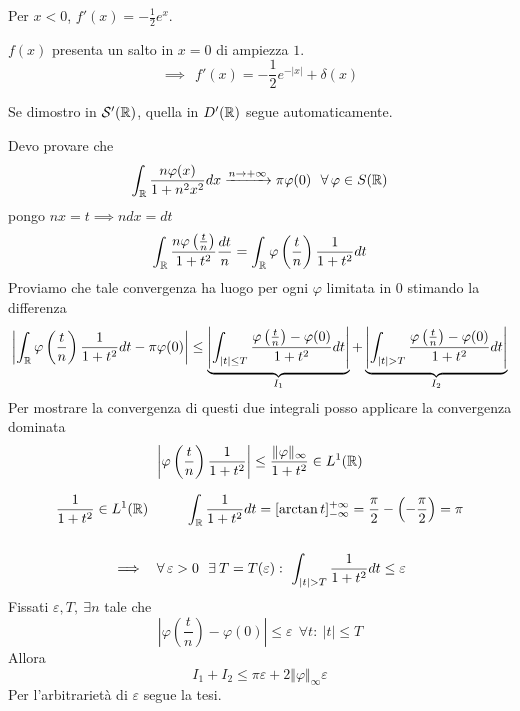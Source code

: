 Per $x < 0$, $f'(x) = - \frac{1}{2} e^{x}$.

$f(x)$ presenta un salto in $x = 0$ di ampiezza $1$.
\begin{equation*}
\implies \ \ f'(x) = - \frac{1}{2} e^{ - | x| } + \delta (x)
\end{equation*}
\Soluzione


Se dimostro in $\mathcal{S}  '(\mathbb{R})$, quella in $D'(\mathbb{R})$ segue automaticamente.

Devo provare che
\begin{equation*}
\int _{\RR }\frac{n\varphi (x)}{1 + n^{2} x^{2}} dx\xrightarrow{n\rightarrow + \infty } \pi \varphi (0) \ \ \forall \varphi \in S(\RR)
\end{equation*}
pongo $nx = t\implies ndx = dt$
\begin{equation*}
\int _{\mathbb{R} }\frac{n\varphi \left(\frac{t}{n}\right)}{1 + t^{2}}\frac{dt}{n} = \int _{\mathbb{R} } \varphi \left(\frac{t}{n}\right)\frac{1}{1 + t^{2}} dt
\end{equation*}
Proviamo che tale convergenza ha luogo per ogni $\varphi $ limitata in $0$ stimando la differenza
\begin{equation*}
\left| \int _{\mathbb{R} } \varphi \left(\frac{t}{n}\right)\frac{1}{1 + t^{2}} dt - \pi \varphi (0)\right| \leq \underbrace{\left| \int _{| t| \leq T}\frac{\varphi \left(\frac{t}{n}\right) - \varphi (0)}{1 + t^{2}} dt\right| }_{I_{1}} + \underbrace{\left| \int _{| t|  > T}\frac{\varphi \left(\frac{t}{n}\right) - \varphi (0)}{1 + t^{2}} dt\right| }_{I_{2}}
\end{equation*}
Per mostrare la convergenza di questi due integrali posso applicare la convergenza dominata
\begin{equation*}
\left| \varphi \left(\frac{t}{n}\right)\frac{1}{1 + t^{2}}\right| \leq \frac{\Vert \varphi \Vert _{\infty }}{1 + t^{2}} \in L^{1}(\mathbb{R})
\end{equation*}
\begin{rem}
\begin{gather*}
\frac{1}{1 + t^{2}} \in L^{1}(\RR) \ \ \ \ \ \ \ \ \int _{\RR }\frac{1}{1 + t^{2}} dt = [\arctan t]^{ + \infty }_{ - \infty } = \frac{\pi }{2} - \left(- \frac{\pi }{2}\right) = \pi \\
\\
\implies \ \ \forall \varepsilon  > 0\ \ \exists T = T(\varepsilon) :\ \int _{| t|  > T}\frac{1}{1 + t^{2}} dt\leq \varepsilon 
\end{gather*}
Fissati $\varepsilon ,T,\ \exists n$ tale che
\begin{equation*}
\left| \varphi \left(\frac{t}{n}\right) - \varphi (0)\right| \leq \varepsilon \ \ \forall t:\ | t| \leq T
\end{equation*}
Allora
\begin{equation*}
I_{1} + I_{2} \leq \pi \varepsilon + 2\Vert \varphi \Vert _{\infty } \varepsilon 
\end{equation*}
Per l'arbitrarietà di $\varepsilon $ segue la tesi.
\end{rem}
\Soluzione

